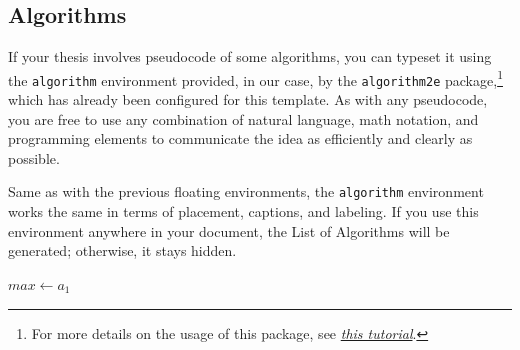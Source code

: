 \subsection{Algorithms}
\label{sec:algs}

If your thesis involves pseudocode of some algorithms, you can typeset it using the \verb|algorithm| environment
provided, in our case, by the \texttt{algorithm2e} package,\footnote{For more details on the usage of this package,
see \emph{\href{https://www.overleaf.com/learn/latex/Algorithms\#The\_algorithm2e\_package}{this tutorial}}.}
which has already been configured for this template. As with any pseudocode, you are free to use any combination
of natural language, math notation, and programming elements to communicate the idea as efficiently and clearly as
possible.

Same as with the previous floating environments, the \verb|algorithm| environment works the same in terms of
placement, captions, and labeling. If you use this environment anywhere in your document, the List of Algorithms
will be generated; otherwise, it stays hidden.

\begin{algorithm}[htb]
    \caption{Finding the maximum element in a sequence}
    \label{alg:maximum}

    \DontPrintSemicolon


    \BlankLine

    $max \gets a_1$\;
    \;
\end{algorithm}
